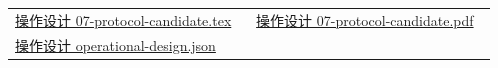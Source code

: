 \documentclass[11pt,a4paper]{article}
\begin{document}
\begin{minipage}{\linewidth}
\begin{tabular}{@{}p{0.48\linewidth}p{0.48\linewidth}@{}}
\href{file:///D:/Agent/srp/agent/design/design-foundation-20261008/07-protocol-candidate.tex}{操作设计 07-\allowbreak{}protocol-\allowbreak{}candidate.tex} & \href{file:///D:/Agent/srp/agent/design/design-foundation-20261008/07-protocol-candidate.pdf}{操作设计 07-\allowbreak{}protocol-\allowbreak{}candidate.pdf}\\[4pt]
\href{file:///D:/Agent/srp/agent/design/design-foundation-20261008/operational-design.json}{操作设计 operational-\allowbreak{}design.json} & \\[4pt]
\end{tabular}\endgroup\end{minipage}\par
\end{document}
